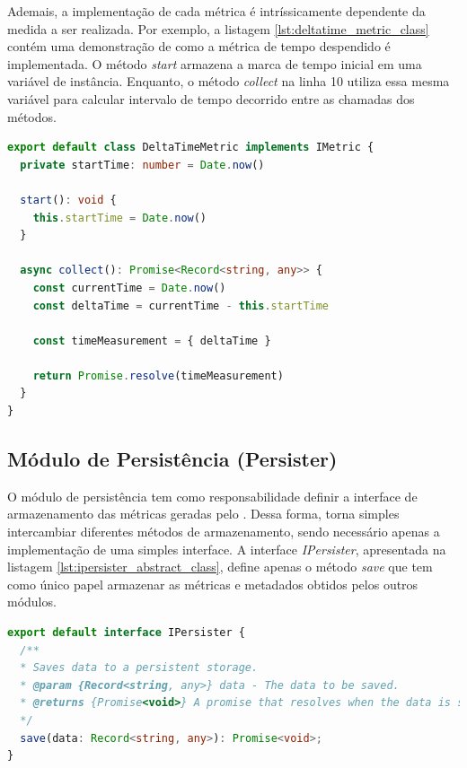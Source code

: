 \documentclass[12pt]{tcc}
\begin{document}
	Ademais, a implementação de cada métrica é intríssicamente dependente da medida a ser realizada.
	Por exemplo, a listagem \ref{lst:deltatime_metric_class} contém uma demonstração de como a métrica de tempo despendido é implementada.
	O método \emph{start} armazena a marca de tempo inicial em uma variável de instância.
	Enquanto, o método \emph{collect} na linha 10 utiliza essa mesma variável para calcular intervalo de tempo decorrido entre as chamadas dos métodos.

\begin{lstlisting}[label={lst:deltatime_metric_class}, caption={Fragmento de código da métrica \emph{DeltaTimeMetric} a qual mede o tempo despendido em milisegundos.}, language=TypeScript, breaklines=true]
export default class DeltaTimeMetric implements IMetric {
  private startTime: number = Date.now()

  start(): void {
    this.startTime = Date.now()
  }

  async collect(): Promise<Record<string, any>> {
    const currentTime = Date.now()
    const deltaTime = currentTime - this.startTime
  
    const timeMeasurement = { deltaTime }
  
    return Promise.resolve(timeMeasurement)
  }
}
\end{lstlisting}


	\subsection{Módulo de Persistência (Persister)}
	\label{subsection:modulo-persister}

	O módulo de persistência tem como responsabilidade definir a interface de armazenamento das métricas geradas pelo .
	Dessa forma, torna simples intercambiar diferentes métodos de armazenamento, sendo necessário apenas a implementação de uma simples interface.
	A interface \emph{IPersister}, apresentada na listagem \ref{lst:ipersister_abstract_class}, define apenas o método \emph{save} que tem como único papel armazenar as métricas e metadados obtidos pelos outros módulos.

\begin{lstlisting}[label={lst:ipersister_abstract_class}, caption={Implementação da interface \emph{IPersister}.}, language=TypeScript, breaklines=true]
export default interface IPersister {
  /**
  * Saves data to a persistent storage.
  * @param {Record<string, any>} data - The data to be saved.
  * @returns {Promise<void>} A promise that resolves when the data is saved.
  */
  save(data: Record<string, any>): Promise<void>;
}
\end{lstlisting}
\end{document}
